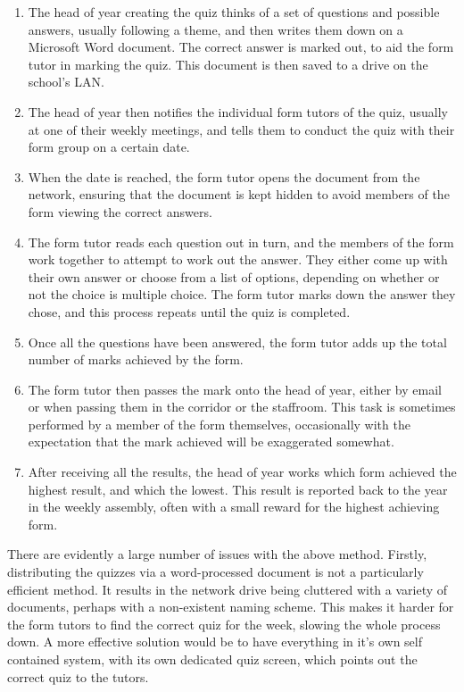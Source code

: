 \begin{enumerate}
\item The head of year creating the quiz thinks of a set of questions and possible answers, usually following a theme, and then writes them down on a Microsoft Word document. The correct answer is marked out, to aid the form tutor in marking the quiz. This document is then saved to a drive on the school's LAN.

\item The head of year then notifies the individual form tutors of the quiz, usually at one of their weekly meetings, and tells them to conduct the quiz with their form group on a certain date.

\item When the date is reached, the form tutor opens the document from the network, ensuring that the document is kept hidden to avoid members of the form viewing the correct answers.

\item The form tutor reads each question out in turn, and the members of the form work together to attempt to work out the answer. They either come up with their own answer or choose from a list of options, depending on whether or not the choice is multiple choice. The form tutor marks down the answer they chose, and this process repeats until the quiz is completed.

\item Once all the questions have been answered, the form tutor adds up the total number of marks achieved by the form.

\item The form tutor then passes the mark onto the head of year, either by email or when passing them in the corridor or the staffroom. This task is sometimes performed by a member of the form themselves, occasionally with the expectation that the mark achieved will be exaggerated somewhat.

\item After receiving all the results, the head of year works which form achieved the highest result, and which the lowest. This result is reported back to the year in the weekly assembly, often with a small reward for the highest achieving form.
\end{enumerate}

There are evidently a large number of issues with the above method. Firstly, distributing the quizzes via a word-processed document is not a particularly efficient method. It results in the network drive being cluttered with a variety of documents, perhaps with a non-existent naming scheme. This makes it harder for the form tutors to find the correct quiz for the week, slowing the whole process down. A more effective solution would be to have everything in it's own self contained system, with its own dedicated quiz screen, which points out the correct quiz to the tutors.

